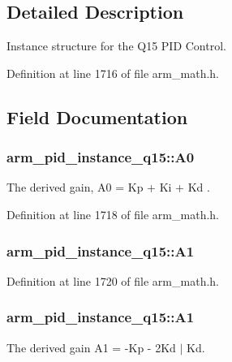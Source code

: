 \subsection{Detailed Description}
Instance structure for the Q15 P\-I\-D Control. 

Definition at line 1716 of file arm\-\_\-math.\-h.



\subsection{Field Documentation}
\hypertarget{structarm__pid__instance__q15_ad77f3a2823c7f96de42c92a3fbf3246b}{
\subsubsection[{A0}]{ arm\-\_\-pid\-\_\-instance\-\_\-q15\-::\-A0}}\label{structarm__pid__instance__q15_ad77f3a2823c7f96de42c92a3fbf3246b}
The derived gain, A0 = Kp + Ki + Kd . 

Definition at line 1718 of file arm\-\_\-math.\-h.

\hypertarget{structarm__pid__instance__q15_ad8ac5ff736c0e51180398c31f777f18a}{
\subsubsection[{A1}]{ arm\-\_\-pid\-\_\-instance\-\_\-q15\-::\-A1}}\label{structarm__pid__instance__q15_ad8ac5ff736c0e51180398c31f777f18a}


Definition at line 1720 of file arm\-\_\-math.\-h.

\hypertarget{structarm__pid__instance__q15_a1b8412c517071962a9acfdc6778906ec}{
\subsubsection[{A1}]{ arm\-\_\-pid\-\_\-instance\-\_\-q15\-::\-A1}}\label{structarm__pid__instance__q15_a1b8412c517071962a9acfdc6778906ec}
The derived gain A1 = -\/\-Kp -\/ 2\-Kd $|$ Kd. 

